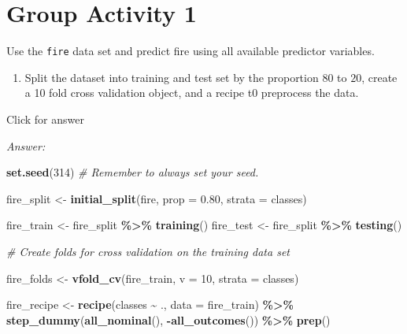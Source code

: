 \documentclass[
]{book}
\newenvironment{Shaded}{\begin{snugshade}}{\end{snugshade}}
\newcommand{\AttributeTok}[1]{\textcolor[rgb]{0.13,0.29,0.53}{#1}}
\newcommand{\CommentTok}[1]{\textcolor[rgb]{0.56,0.35,0.01}{\textit{#1}}}
\newcommand{\DecValTok}[1]{\textcolor[rgb]{0.00,0.00,0.81}{#1}}
\newcommand{\FloatTok}[1]{\textcolor[rgb]{0.00,0.00,0.81}{#1}}
\newcommand{\FunctionTok}[1]{\textcolor[rgb]{0.13,0.29,0.53}{\textbf{#1}}}
\newcommand{\NormalTok}[1]{#1}
\newcommand{\OtherTok}[1]{\textcolor[rgb]{0.56,0.35,0.01}{#1}}
\newcommand{\SpecialCharTok}[1]{\textcolor[rgb]{0.81,0.36,0.00}{\textbf{#1}}}
\providecommand{\tightlist}{%
  \setlength{\itemsep}{0pt}\setlength{\parskip}{0pt}}
\begin{document}
\hypertarget{group-activity-1-11}{%
\section{Group Activity 1}\label{group-activity-1-11}}

Use the \texttt{fire} data set and predict fire using all available predictor variables.

\begin{enumerate}
\def\labelenumi{\alph{enumi}.}
\tightlist
\item
  Split the dataset into training and test set by the proportion \(80\) to \(20\), create a 10 fold cross validation object, and a recipe t0 preprocess the data.
\end{enumerate}

Click for answer

\emph{Answer:}

\begin{Shaded}
\begin{Highlighting}[]
\FunctionTok{set.seed}\NormalTok{(}\DecValTok{314}\NormalTok{) }\CommentTok{\# Remember to always set your seed.}

\NormalTok{fire\_split }\OtherTok{\textless{}{-}} \FunctionTok{initial\_split}\NormalTok{(fire, }\AttributeTok{prop =} \FloatTok{0.80}\NormalTok{,  }\AttributeTok{strata =}\NormalTok{ classes)}

\NormalTok{fire\_train }\OtherTok{\textless{}{-}}\NormalTok{ fire\_split }\SpecialCharTok{\%\textgreater{}\%} \FunctionTok{training}\NormalTok{()}
\NormalTok{fire\_test }\OtherTok{\textless{}{-}}\NormalTok{ fire\_split }\SpecialCharTok{\%\textgreater{}\%} \FunctionTok{testing}\NormalTok{()}

\CommentTok{\# Create folds for cross validation on the training data set}

\NormalTok{fire\_folds }\OtherTok{\textless{}{-}} \FunctionTok{vfold\_cv}\NormalTok{(fire\_train, }\AttributeTok{v =} \DecValTok{10}\NormalTok{, }\AttributeTok{strata =}\NormalTok{ classes)}

\NormalTok{fire\_recipe }\OtherTok{\textless{}{-}} \FunctionTok{recipe}\NormalTok{(classes }\SpecialCharTok{\textasciitilde{}}\NormalTok{ ., }\AttributeTok{data =}\NormalTok{ fire\_train) }\SpecialCharTok{\%\textgreater{}\%}
 \FunctionTok{step\_dummy}\NormalTok{(}\FunctionTok{all\_nominal}\NormalTok{(), }\SpecialCharTok{{-}}\FunctionTok{all\_outcomes}\NormalTok{()) }\SpecialCharTok{\%\textgreater{}\%}
 \FunctionTok{prep}\NormalTok{()}
\end{Highlighting}
\end{Shaded}
\end{document}
